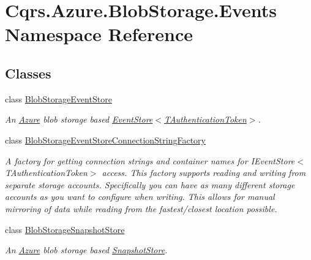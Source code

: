 \hypertarget{namespaceCqrs_1_1Azure_1_1BlobStorage_1_1Events}{}\section{Cqrs.\+Azure.\+Blob\+Storage.\+Events Namespace Reference}
\label{namespaceCqrs_1_1Azure_1_1BlobStorage_1_1Events}
\subsection*{Classes}
\begin{DoxyCompactItemize}
\item 
class \hyperlink{classCqrs_1_1Azure_1_1BlobStorage_1_1Events_1_1BlobStorageEventStore}{Blob\+Storage\+Event\+Store}
\begin{DoxyCompactList}\small\item\em An \hyperlink{namespaceCqrs_1_1Azure}{Azure} blob storage based \hyperlink{classCqrs_1_1Events_1_1EventStore_a6346cb2aea4c5b4e740dc6cfb15abab8_a6346cb2aea4c5b4e740dc6cfb15abab8}{Event\+Store$<$\+T\+Authentication\+Token$>$}. \end{DoxyCompactList}\item 
class \hyperlink{classCqrs_1_1Azure_1_1BlobStorage_1_1Events_1_1BlobStorageEventStoreConnectionStringFactory}{Blob\+Storage\+Event\+Store\+Connection\+String\+Factory}
\begin{DoxyCompactList}\small\item\em A factory for getting connection strings and container names for I\+Event\+Store$<$\+T\+Authentication\+Token$>$ access. This factory supports reading and writing from separate storage accounts. Specifically you can have as many different storage accounts as you want to configure when writing. This allows for manual mirroring of data while reading from the fastest/closest location possible. \end{DoxyCompactList}\item 
class \hyperlink{classCqrs_1_1Azure_1_1BlobStorage_1_1Events_1_1BlobStorageSnapshotStore}{Blob\+Storage\+Snapshot\+Store}
\begin{DoxyCompactList}\small\item\em An \hyperlink{namespaceCqrs_1_1Azure}{Azure} blob storage based \hyperlink{classCqrs_1_1Snapshots_1_1SnapshotStore_aa8ab186f864443c7d9647a4522864a84_aa8ab186f864443c7d9647a4522864a84}{Snapshot\+Store}. \end{DoxyCompactList}\item 

\end{DoxyCompactItemize}
